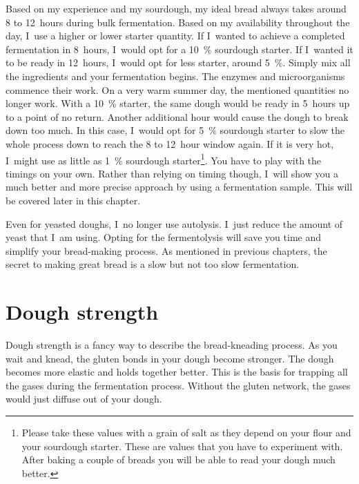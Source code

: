 Based on my experience and my sourdough, my ideal bread always takes around 8
to 12~hours during bulk fermentation. Based on my availability throughout the
day, I~use a higher or lower starter quantity. If I~wanted to achieve a
completed fermentation in 8~hours, I~would opt for a \qty{10}{\percent}
sourdough starter. If I~wanted it to be ready in 12~hours, I~would opt for
less starter, around \qty{5}{\percent}.  Simply mix all the ingredients and
your fermentation begins. The enzymes and microorganisms commence their work.
On a very warm summer day, the mentioned quantities no longer work. With a
\qty{10}{\percent} starter, the same dough would be ready in 5~hours up to a
point of no return. Another additional hour would cause the dough to break
down too much. In this case, I~would opt for \qty{5}{\percent} sourdough
starter to slow the whole process down to reach the 8 to 12~hour window again.
If it is very hot, I~might use as little as \qty{1}{\percent} sourdough
starter\footnote{Please take these values with a grain of salt as they depend
    on your flour and your sourdough starter. These are values that you have
    to experiment with. After baking a couple of breads you will be able to
    read your dough much better.}. You have to play with the timings on your
own.  Rather than relying on timing though, I~will show you a much better and
more precise approach by using a fermentation sample. This will be covered
later in this chapter.

Even for yeasted doughs, I~no longer use autolysis. I~just reduce the amount
of yeast that I~am using. Opting for the fermentolysis will
save you time and simplify your bread-making process. As mentioned in previous chapters,
the secret to making great bread is a slow but not too slow fermentation.

\section{Dough strength}

Dough strength is a fancy way to describe the bread-kneading process. As you wait and
knead, the gluten bonds in your dough become stronger. The dough
becomes more elastic and holds together better. This is the basis for trapping
all the gases during the fermentation process. Without the gluten network,
the gases would just diffuse out of your dough.

\begin{flowchart}[!htb]
\centering
  
  \caption{The gluten development process for a wheat-based dough.}%
  \label{fig:wheat-sourdough-kneading-process}
\end{flowchart}

